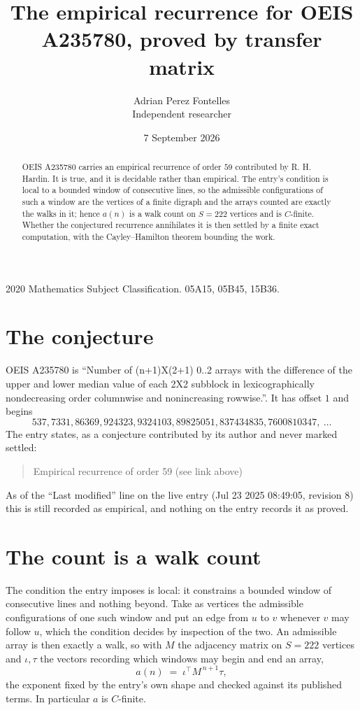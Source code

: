 \documentclass[11pt,a4paper]{article}
\title{The empirical recurrence for OEIS A235780, proved by transfer matrix}
\author{Adrian Perez Fontelles\\ \small Independent researcher}
\date{7 September 2026}
\theoremstyle{plain}
\theoremstyle{definition}
\begin{document}
\maketitle

\begin{abstract}
OEIS A235780 carries an empirical recurrence of order $59$ contributed by R. H. Hardin. It is
true, and it is decidable rather than empirical. The entry's condition is local to a bounded window of consecutive lines, so
the admissible configurations of such a window are the vertices of a finite digraph and the
arrays counted are exactly the walks in it; hence $a(n)$ is a walk count on $S=222$ vertices
and is $C$-finite. Whether the conjectured recurrence annihilates it is then settled by a
finite exact computation, with the Cayley--Hamilton theorem bounding the work.
\end{abstract}

\noindent\small 2020 Mathematics Subject Classification. 05A15, 05B45, 15B36.\normalsize

\section{The conjecture}

OEIS A235780 is ``Number of (n+1)X(2+1) 0..2 arrays with the difference of the upper and lower median value of each 2X2 subblock in lexicographically nondecreasing order columnwise and nonincreasing rowwise.''. It has offset $1$ and begins
\[
537, 7331, 86369, 924323, 9324103, 89825051, 837434835, 7600810347,\ \dots
\]
The entry states, as a conjecture contributed by its author and never marked settled:
\begin{quote}
Empirical recurrence of order 59 (see link above)
\end{quote}
As of the ``Last modified'' line on the live entry (Jul 23 2025 08:49:05, revision 8) this is still
recorded as empirical, and nothing on the entry records it as proved.

\section{The count is a walk count}

The condition the entry imposes is local: it constrains a bounded window of consecutive lines and nothing beyond. Take as
vertices the admissible configurations of one such window and put an edge from $u$ to $v$
whenever $v$ may follow $u$, which the condition decides by inspection of the two. An
admissible array is then exactly a walk, so with $M$ the adjacency matrix on $S=222$ vertices
and $\iota,\tau$ the vectors recording which windows may begin and end an array,
\[
a(n)\;=\;\iota^{\!\top}M^{\,n+1}\tau ,
\]
the exponent fixed by the entry's own shape and checked against its published terms. In
particular $a$ is $C$-finite.
\end{document}
